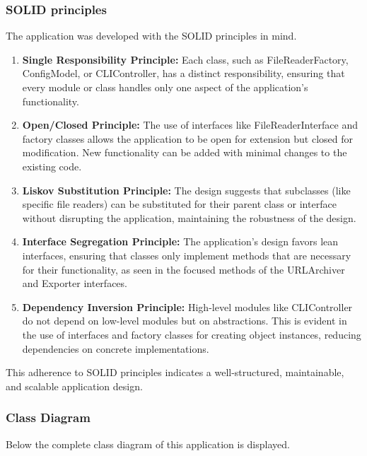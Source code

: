 \subsubsection{SOLID principles}
The application was developed with the SOLID principles in mind. 
\begin{enumerate}
    \item \textbf{Single Responsibility Principle:} Each class, such as FileReaderFactory, ConfigModel, or CLIController, has a distinct responsibility, ensuring that every module or class handles only one aspect of the application's functionality.
    \item \textbf{Open/Closed Principle:} The use of interfaces like FileReaderInterface and factory classes allows the application to be open for extension but closed for modification. New functionality can be added with minimal changes to the existing code.
    \item \textbf{Liskov Substitution Principle:} The design suggests that subclasses (like specific file readers) can be substituted for their parent class or interface without disrupting the application, maintaining the robustness of the design.
    \item \textbf{Interface Segregation Principle:} The application's design favors lean interfaces, ensuring that classes only implement methods that are necessary for their functionality, as seen in the focused methods of the URLArchiver and Exporter interfaces.
    \item \textbf{Dependency Inversion Principle:} High-level modules like CLIController do not depend on low-level modules but on abstractions. This is evident in the use of interfaces and factory classes for creating object instances, reducing dependencies on concrete implementations.
\end{enumerate}

This adherence to SOLID principles indicates a well-structured, maintainable, and scalable application design.

\subsubsection{Class Diagram}
Below the complete class diagram of this application is displayed. 

